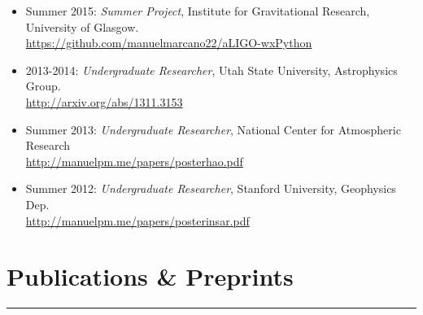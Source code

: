 \documentclass[letterpaper,10pt]{article}
\begin{document}



\begin{itemize}[label=$\blacktriangleright$]
\item Summer 2015: \emph{Summer Project}, Institute for Gravitational Research, University of Glasgow.\\
\url{https://github.com/manuelmarcano22/aLIGO-wxPython}
\end{itemize}



\begin{itemize}[label=$\blacktriangleright$]
  \item 2013-2014: \emph{Undergraduate Researcher}, Utah State University, Astrophysics Group.  \\
  \url{http://arxiv.org/abs/1311.3153}
  \end{itemize}

\begin{itemize}[label=$\blacktriangleright$]
  \item Summer 2013: \emph{Undergraduate Researcher}, National Center for Atmospheric Research \\
\url{http://manuelpm.me/papers/posterhao.pdf}
  \end{itemize}

\begin{itemize}[label=$\blacktriangleright$]
  \item Summer 2012: \emph{Undergraduate Researcher}, Stanford University, Geophysics Dep.\ \\
\url{http://manuelpm.me/papers/posterinsar.pdf} 
  \end{itemize}

\section*{Publications \& Preprints}
\hrule
\vspace{.3 cm}
\end{document}

